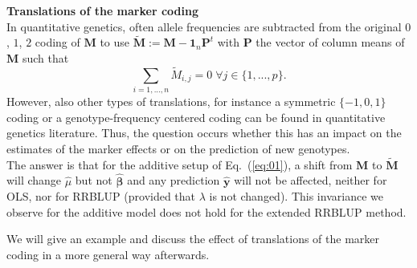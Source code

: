 \documentclass{bmcart}
\newcommand{\M}{\mathbf{M}}
\newcommand{\0}{\mathbf{0}}
\renewcommand{\P}{\mathbf{P}}
\begin{document}
{\bf Translations of the marker coding}\vspace{0.2cm}\\
In quantitative genetics, often allele frequencies are subtracted from the original $0$, $1$, $2$ coding of $\M$ to 
use $\tilde{\M}:=\M-\mathbf{1}_n\P^t$ with $\P$ the vector of column means of $\M$ such that $$\sum\limits_{i=1,...,n} \tilde{M}_{i,j} = 0\; \forall j \in \{1,...,p\}.$$ However, also other types of translations, for instance a symmetric $\{-1,0,1\}$ coding or a genotype-frequency centered coding \cite{vitezica} can be found in quantitative genetics literature. Thus, the question occurs whether this has an impact on the estimates of the marker effects or on the prediction of new genotypes. \\

The answer is that for the additive setup of Eq.~(\ref{eq:01}), a shift from $\M$ to $\tilde{\M}$ will change $\hat{\mu}$ but not $\hat{\bm{\beta}}$ and any prediction $\hat{\mathbf{y}}$ will not be affected, neither for OLS, nor for RRBLUP (provided that $\lambda$ is not changed). This invariance we observe for the additive model does not hold for the extended RRBLUP method.

We will give an example and discuss the effect of translations of the marker coding in a more general way afterwards. \\
\end{document}
